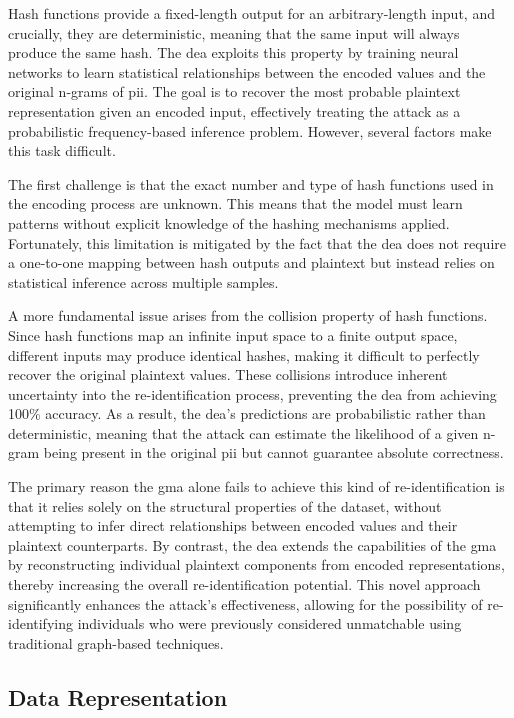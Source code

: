 Hash functions provide a fixed-length output for an arbitrary-length input, and crucially, they are deterministic, meaning that the same input will always produce the same hash.
The \ac{dea} exploits this property by training neural networks to learn statistical relationships between the encoded values and the original n-grams of \ac{pii}.
The goal is to recover the most probable plaintext representation given an encoded input, effectively treating the attack as a probabilistic frequency-based inference problem.
However, several factors make this task difficult.

The first challenge is that the exact number and type of hash functions used in the encoding process are unknown.
This means that the model must learn patterns without explicit knowledge of the hashing mechanisms applied.
Fortunately, this limitation is mitigated by the fact that the \ac{dea} does not require a one-to-one mapping between hash outputs and plaintext but instead relies on statistical inference across multiple samples.

A more fundamental issue arises from the collision property of hash functions.
Since hash functions map an infinite input space to a finite output space, different inputs may produce identical hashes, making it difficult to perfectly recover the original plaintext values.
These collisions introduce inherent uncertainty into the re-identification process, preventing the \ac{dea} from achieving 100\% accuracy.
As a result, the \ac{dea}'s predictions are probabilistic rather than deterministic, meaning that the attack can estimate the likelihood of a given n-gram being present in the original \ac{pii} but cannot guarantee absolute correctness.

The primary reason the \ac{gma} alone fails to achieve this kind of re-identification is that it relies solely on the structural properties of the dataset, without attempting to infer direct relationships between encoded values and their plaintext counterparts.
By contrast, the \ac{dea} extends the capabilities of the \ac{gma} by reconstructing individual plaintext components from encoded representations, thereby increasing the overall re-identification potential.
This novel approach significantly enhances the attack's effectiveness, allowing for the possibility of re-identifying individuals who were previously considered unmatchable using traditional graph-based techniques.

\subsection{Data Representation} \label{sec:representation}

